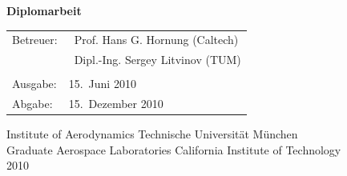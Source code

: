 \begin{center}
\vspace*{2.8cm}
{\bfseries Diplomarbeit}

\vspace*{1.2cm}
\normalsize
\vfill
\begin{tabular}{ll}
Betreuer: & ~Prof. Hans G. Hornung (Caltech)\\
\ & \ Dipl.-Ing. Sergey Litvinov (TUM)\\
 \\
Ausgabe: & 15.\ Juni 2010\\
Abgabe: & 15.\ Dezember 2010\\
\end{tabular}

\vspace*{1.6cm}
Institute of Aerodynamics Technische Universit\"{a}t M\"{u}nchen\\
Graduate Aerospace Laboratories California Institute of Technology\\
2010	
\end{center}

\pagebreak
\pagestyle{plain}

%

